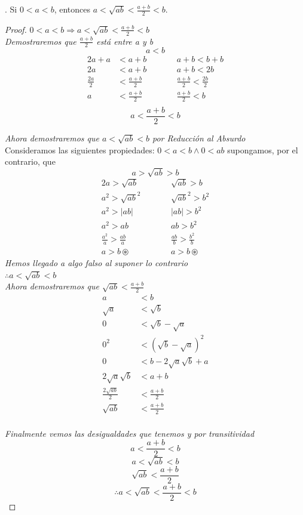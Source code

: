 \documentclass{article}
\begin{document}
  . Si \(0<a<b\), entonces \(a<\sqrt{ab}<\frac{a+b}{2}<b\).
\begin{proof}
\(0<a<b \Rightarrow a < \sqrt{ab} < \frac{a+b}{2} < b\)\\

\textit{Demostraremos que \(\frac{a+b}{2}\) está entre a y b}\\
\[a<b\]
\begin{alignat*}{2}
a + a &< a + b \quad && \quad a + b < b + b \\
2a &< a + b \quad &&  \quad a + b < 2b \\
\frac{2a}{2} &< \frac{a + b}{2} \quad && \quad \frac{a + b}{2} < \frac{2b}{2} \\
a &< \frac{a + b}{2} \quad && \quad \frac{a + b}{2} < b \\
\end{alignat*}
\[a <  \frac{a + b}{2} < b\]
    
\textit{Ahora demostraremos que \(a<\sqrt{ab}<b\) por Reducción al Absurdo}\\
Consideramos las siguientes propiedades: \(0<a<b \wedge 0<ab\)
supongamos, por el contrario, que \[a>\sqrt{ab}>b\]
\begin{alignat*}{2}
a > \sqrt{ab} \quad && \quad \sqrt{ab} > b \\
a^2 > \sqrt{ab}^2 \quad && \quad \sqrt{ab}^2 > b^2 \\
a^2 > |ab| \quad && \quad |ab| > b^2 \\
a^2 > ab \quad && \quad ab > b^2 \\
\frac{a^2}{a} > \frac{ab}{a} \quad && \quad \frac{ab}{b} > \frac{b^2}{b} \\
a > b \circledast \quad && \quad a > b \circledast
\end{alignat*}
\textit{Hemos llegado a algo falso al suponer lo contrario} \\
\( \therefore a<\sqrt{ab}<b\) \\

\textit{Ahora demostraremos que \(\sqrt{ab}<\frac{a+b}{2}\)} \\
\begin{align*}
a &< b \\
\sqrt{a} &< \sqrt{b} \\
0 &< \sqrt{b} - \sqrt{a} \\
0^2 &< (\sqrt{b} - \sqrt{a})^2 \\
0 &< b - 2\sqrt{a}\sqrt{b} + a \\
2\sqrt{a}\sqrt{b} &< a + b \\
\frac{2\sqrt{ab}}{2} &< \frac{a + b}{2} \\
\sqrt{ab} &< \frac{a + b}{2} \\
\end{align*}

\textit{Finalmente vemos las desigualdades que tenemos y por transitividad}
\[a <  \frac{a + b}{2} < b\]
\[a < \sqrt{ab} < b\]
\[\sqrt{ab} < \frac{a + b}{2} \]
\[ \therefore a<\sqrt{ab}<\frac{a+b}{2}<b\]

\end{proof}
\end{document}
